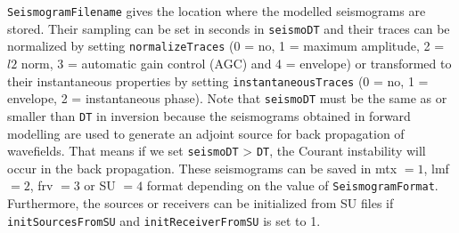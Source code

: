 \documentclass[pdftex,a4paper,parskip,listof=totoc,bibliography=totoc,onehalfspacing,12pt]{scrreprt}
\begin{document}
\verb+SeismogramFilename+ gives the location where the modelled seismograms are stored. Their sampling can be set in seconds in \verb+seismoDT+ and their traces can be normalized by setting \verb+normalizeTraces+ (0 = no, 1 = maximum amplitude, 2 = $l2$ norm, 3 = automatic gain control (AGC) and 4 = envelope) or transformed to their instantaneous properties by setting \verb+instantaneousTraces+ (0 = no, 1 = envelope, 2 = instantaneous phase). Note that \verb+seismoDT+ must be the same as or smaller than \verb+DT+ in inversion because the seismograms obtained in forward modelling are used to generate an adjoint source for back propagation of wavefields. That means if we set \verb+seismoDT+ > \verb+DT+, the Courant instability will occur in the back propagation.
These seismograms can be saved in mtx $=1$, lmf $=2$, frv $=3$ or SU $=4$ format depending on the value of \verb+SeismogramFormat+.  
Furthermore, the sources or receivers can be initialized from SU files if \verb+initSourcesFromSU+ and \verb+initReceiverFromSU+ is set to 1.
\end{document}
